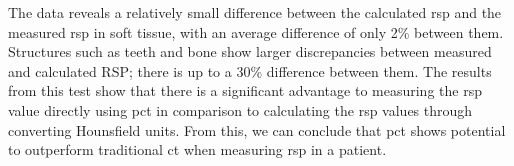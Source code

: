 \documentclass[main.tex]{subfiles}
\begin{document}
The data reveals a relatively small difference between the calculated \gls{rsp} and the measured \gls{rsp} in soft tissue, with an average difference of only 2\% between them. Structures such as teeth and bone show larger discrepancies between measured and calculated RSP; there is up to a 30\% difference between them. The results from this test show that there is a significant advantage to measuring the \gls{rsp} value directly using \gls{pct} in comparison to calculating the \gls{rsp} values through converting Hounsfield units. From this, we can conclude that \gls{pct} shows potential to outperform traditional \gls{ct} when measuring \gls{rsp} in a patient.    
\end{document}
